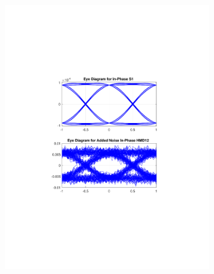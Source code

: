 \begin{figure}[H]
	\centering
	\begin{subfigure}{.45\textwidth}
		\centering
		\includegraphics[clip, trim=5cm 4cm 5cm 4cm, width=\textwidth]{./sdf/m_qam_system/figures/eyes/if_n_nmf_45_60_rc_09.pdf}
	\end{subfigure}
	\begin{subfigure}{.45\textwidth}
		\centering

\end{subfigure}
\end{figure}

